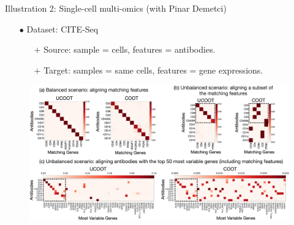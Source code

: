 \documentclass{beamer}
\begin{document}
\begin{frame}{Illustration 2: Single-cell multi-omics (with Pinar Demetci)}
\scriptsize
\vspace{-0.2cm}
\begin{itemize}
  \item[$\bullet$] Dataset: CITE-Seq \parencite{CITEseq}
  \begin{itemize}
    \scriptsize
    \setlength\itemindent{10pt}
    \item[$+$] Source: sample = cells, features = antibodies.
    \item[$+$] Target: samples = same cells, features = gene expressions.
  \end{itemize}
\end{itemize}
\vspace{-0.5cm}
\begin{figure}
      \centering
      \includegraphics[width=1.05\linewidth, keepaspectratio=true]{OT_new/genes-alignments.pdf}
  \end{figure}


\end{frame}
\end{document}

